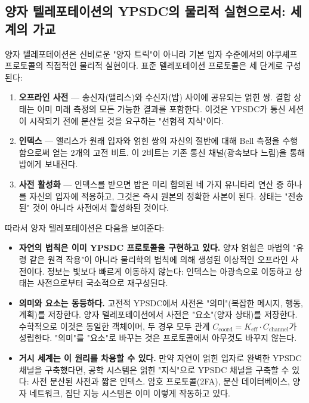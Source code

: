 \documentclass[12pt,a4paper]{article}
\begin{document}
	\subsection{양자 텔레포테이션의 YPSDC의 물리적 실현으로서: 세계의 가교}
	
	양자 텔레포테이션은 신비로운 "양자 트릭"이 아니라 기본 입자 수준에서의 야쿠셰프 프로토콜의 직접적인 물리적 실현이다. 표준 텔레포테이션 프로토콜은 세 단계로 구성된다:
	
	\begin{enumerate}
		\item \textbf{오프라인 사전} — 송신자(앨리스)와 수신자(밥) 사이에 공유되는 얽힌 쌍. 결합 상태는 이미 미래 측정의 모든 가능한 결과를 포함한다. 이것은 YPSDC가 통신 세션이 시작되기 전에 분산될 것을 요구하는 "선험적 지식"이다.
		\item \textbf{인덱스} — 앨리스가 원래 입자와 얽힌 쌍의 자신의 절반에 대해 Bell 측정을 수행함으로써 얻는 2개의 고전 비트. 이 2비트는 기존 통신 채널(광속보다 느림)을 통해 밥에게 보내진다.
		\item \textbf{사전 활성화} — 인덱스를 받으면 밥은 미리 합의된 네 가지 유니타리 연산 중 하나를 자신의 입자에 적용하고, 그것은 즉시 원본의 정확한 사본이 된다. 상태는 "전송된" 것이 아니라 사전에서 활성화된 것이다.
	\end{enumerate}
	
	따라서 양자 텔레포테이션은 다음을 보여준다:
	
	\begin{itemize}
		\item \textbf{자연의 법칙은 이미 YPSDC 프로토콜을 구현하고 있다.} 양자 얽힘은 마법의 "유령 같은 원격 작용"이 아니라 물리학의 법칙에 의해 생성된 이상적인 오프라인 사전이다. 정보는 빛보다 빠르게 이동하지 않는다: 인덱스는 아광속으로 이동하고 상태는 사전으로부터 국소적으로 재구성된다.
		\item \textbf{의미와 요소는 동등하다.} 고전적 YPSDC에서 사전은 "의미"(복잡한 메시지, 행동, 계획)를 저장한다. 양자 텔레포테이션에서 사전은 "요소"(양자 상태)를 저장한다. 수학적으로 이것은 동일한 객체이며, 두 경우 모두 관계 $C_{\mathrm{coord}} = K_{\mathrm{eff}} \cdot C_{\mathrm{channel}}$가 성립한다. "의미"를 "요소"로 바꾸는 것은 프로토콜에서 아무것도 바꾸지 않는다.
		\item \textbf{거시 세계는 이 원리를 차용할 수 있다.} 만약 자연이 얽힌 입자로 완벽한 YPSDC 채널을 구축했다면, 공학 시스템은 얽힌 "지식"으로 YPSDC 채널을 구축할 수 있다: 사전 분산된 사전과 짧은 인덱스. 암호 프로토콜(2FA), 분산 데이터베이스, 양자 네트워크, 집단 지능 시스템은 이미 이렇게 작동하고 있다.
	\end{itemize}
	
\end{document}
